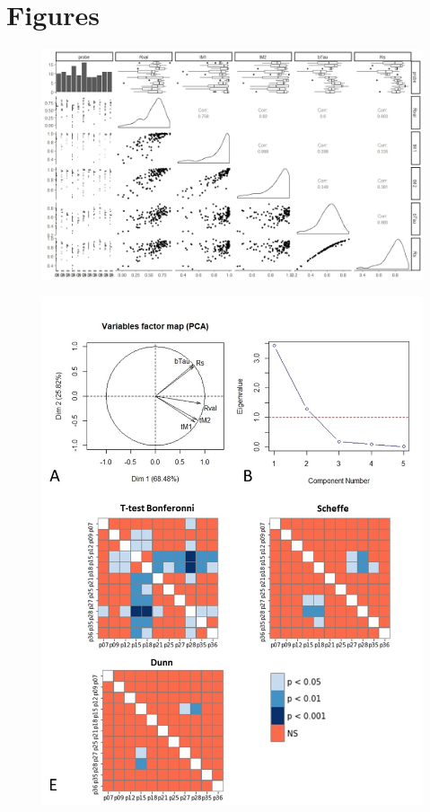 \documentclass[num-refs]{wiley-article}
\begin{document}
\section*{Figures}

\begin{figure}[hbt!]
  \includegraphics[width=1\linewidth]{supp1.jpeg}
  \caption{}
  \centering
\end{figure}

\begin{figure}[hbt!]
  \includegraphics[width=1\linewidth]{supp2.jpg}
  \caption{}
  \centering
\end{figure}
\end{document}
